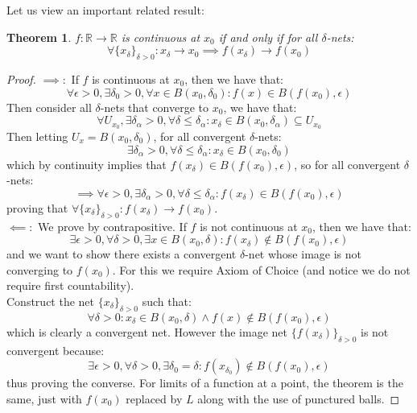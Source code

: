\documentclass[10pt,letterpaper]{article} %
\newtheorem{thm}{Theorem}[section]
\begin{document}
Let us view an important related result:
\begin{thm}
$f: \mathbb{R} \xrightarrow{} \mathbb{R}$ is continuous at $x_0$ if and only if for all $\delta$-nets:
\begin{equation*}
\forall \{x_\delta\}_{\delta > 0}: x_\delta \xrightarrow{} x_0 \implies f(x_\delta) \xrightarrow{} f(x_0)
\end{equation*}
\end{thm}
\begin{proof}
$\implies:$ If $f$ is continuous at $x_0$, then we have that:
\begin{equation*}
\forall \epsilon > 0, \exists \delta_0 > 0, \forall x \in B(x_0, \delta_0): f(x) \in B(f(x_0), \epsilon)
\end{equation*}
Then consider all $\delta$-nets that converge to $x_0$, we have that:
\begin{equation*}
\forall U_{x_0}, \exists \delta_\alpha > 0, \forall \delta \leqslant \delta_\alpha: x_\delta \in B(x_0, \delta_\alpha) \subseteq U_{x_0}
\end{equation*}
Then letting $U_x = B(x_0, \delta_0)$, for all convergent $\delta$-nets:
\begin{equation*}
\exists \delta_\alpha > 0, \forall \delta \leqslant \delta_\alpha: x_\delta \in B(x_0, \delta_0)
\end{equation*}
which by continuity implies that $f(x_\delta) \in B(f(x_0), \epsilon)$, so for all convergent $\delta$-nets:
\begin{equation*}
\implies \forall \epsilon > 0, \exists \delta_\alpha > 0, \forall \delta \leqslant \delta_\alpha: f(x_\delta) \in B(f(x_0), \epsilon)
\end{equation*}
proving that $\forall \{x_\delta\}_{\delta > 0}: f(x_\delta) \xrightarrow{} f(x_0)$.\\

$\impliedby:$ We prove by contrapositive. If $f$ is not continuous at $x_0$, then we have that:
\begin{equation*}
\exists \epsilon > 0, \forall \delta > 0, \exists x \in B(x_0, \delta): f(x_\delta) \notin B(f(x_0), \epsilon)
\end{equation*}
and we want to show there exists a convergent $\delta$-net whose image is not converging to $f(x_0)$. For this we require Axiom of Choice (and notice we do not require first countability).\\

Construct the net $\{x_\delta\}_{\delta > 0}$ such that:
\begin{equation*}
\forall \delta > 0: x_\delta \in B(x_0, \delta) \land f(x) \notin B(f(x_0), \epsilon)
\end{equation*}
which is clearly a convergent net. However the image net $\{f(x_\delta)\}_{\delta > 0}$ is not convergent because:
\begin{equation*}
\exists \epsilon > 0, \forall \delta > 0, \exists \delta_0 = \delta: f(x_{\delta_0}) \notin B(f(x_0), \epsilon)
\end{equation*}
thus proving the converse. For limits of a function at a point, the theorem is the same, just with $f(x_0)$ replaced by $L$ along with the use of punctured balls.
\end{proof}
\end{document}
